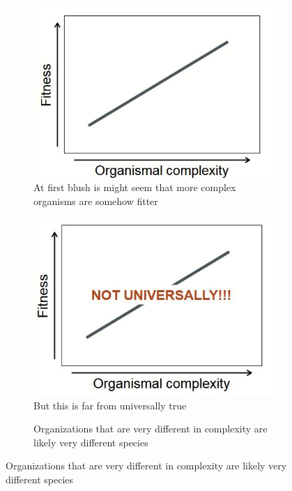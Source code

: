 \documentclass[]{article}
\begin{document}
\begin{figure}[H]
	\caption{Fitness and Complexity}\label{fig:FitComplex}
	\begin{subfigure}[t]{0.45\textwidth}
		\caption{At first blush is might seem that more complex organisms are somehow fitter}\label{fig:FitComplex1}
		\includegraphics[width=\textwidth]{FitComplex1}
	\end{subfigure}
	\begin{subfigure}[t]{0.45\textwidth}
		\caption{But this is far from universally true}\label{fig:FitComplex2}
		\includegraphics[width=\textwidth]{FitComplex2}
	\end{subfigure}
	\begin{subfigure}[t]{0.45\textwidth}
		\caption{Organizations that are very different in complexity are likely very different species}\label{fig:FitComplex3}

\end{subfigure}
\end{figure}
\end{document}

